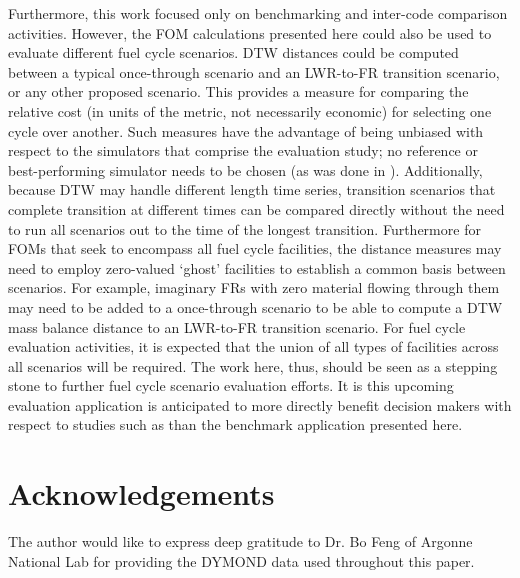 \documentclass{ntmanuscript}
\begin{document}
Furthermore, this work focused only on benchmarking and inter-code comparison
activities.
However, the FOM calculations presented here could also be used to evaluate
different fuel cycle scenarios. DTW distances could be computed between
a typical once-through scenario and an LWR-to-FR transition
scenario, or any other proposed scenario. This provides a measure for
comparing the relative cost (in units of the metric, not necessarily
economic) for selecting one cycle over another.
Such measures have the advantage of being unbiased with respect to the
simulators that comprise the evaluation study; no reference or best-performing
simulator needs to be chosen (as was done in \cite{wigeland2014nuclear}).
Additionally, because DTW may handle different length time series,
transition scenarios that complete transition at different times can be
compared directly without the need to run all scenarios out to the time of
the longest transition.
Furthermore for FOMs that seek to encompass all fuel cycle facilities,
the distance measures may need to employ zero-valued `ghost'
facilities to establish a common basis between scenarios.  For example,
imaginary FRs with zero material flowing through them may need to be added
to a once-through scenario to be able to compute a DTW mass balance distance
to an LWR-to-FR transition scenario. For fuel cycle evaluation activities,
it is expected that the union of all types of facilities across all scenarios
will be required.
The work here, thus,
should be seen as a stepping stone to further fuel cycle scenario evaluation
efforts. It is this upcoming evaluation application is anticipated to more
directly benefit decision makers with respect to studies such as
\cite{wigeland2014nuclear} than the benchmark application presented here.

\section*{Acknowledgements}
\label{acknow}
The author would like to express deep gratitude to Dr. Bo Feng of
Argonne National Lab for providing the DYMOND data used throughout this
paper.



\end{document}
